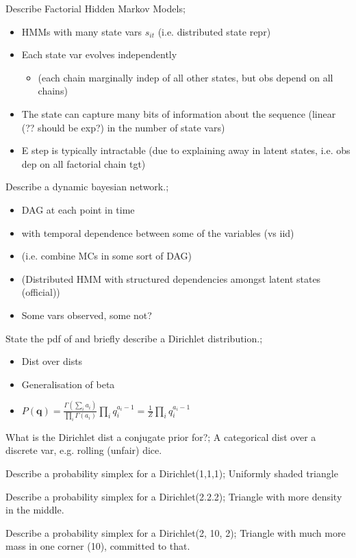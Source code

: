 \documentclass{article}
\begin{document}
Describe Factorial Hidden Markov Models; \begin{itemize} \item HMMs with many state vars $s_{it}$ (i.e. distributed state repr) \item Each state var evolves independently \begin{itemize} \item (each chain marginally indep of all other states, but obs depend on all chains) \end{itemize} \item The state can capture many bits of information about the sequence (linear (?? should be exp?) in the number of state vars) \item E step is typically intractable (due to explaining away in latent states, i.e. obs dep on all factorial chain tgt) \end{itemize}

Describe a dynamic bayesian network.; \begin{itemize} \item DAG at each point in time \item with temporal dependence between some of the variables (vs iid) \item (i.e. combine MCs in some sort of DAG) \item (Distributed HMM with structured dependencies amongst latent states (official)) \item Some vars observed, some not? \end{itemize}

State the pdf of and briefly describe a Dirichlet distribution.; \begin{itemize} \item Dist over dists \item Generalisation of beta \item $P(\mathbf{q})=\frac{\Gamma(\sum_i a_i)}{\prod_i \Gamma(a_i)}\prod_i q^{a_i-1}_i=\frac{1}{Z}\prod_iq_i^{a_i-1}$ \end{itemize}

What is the Dirichlet dist a conjugate prior for?; A categorical dist over a discrete var, e.g. rolling (unfair) dice.

Describe a probability simplex for a Dirichlet(1,1,1); Uniformly shaded triangle

Describe a probability simplex for a Dirichlet(2.2.2); Triangle with more density in the middle.

Describe a probability simplex for a Dirichlet(2, 10, 2); Triangle with much more mass in one corner (10), committed to that.
\end{document}
